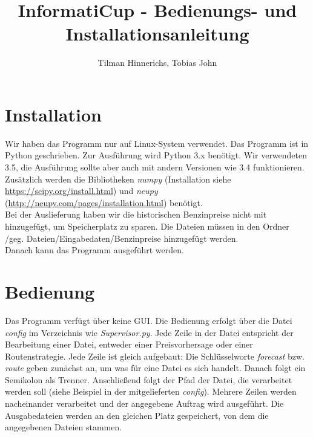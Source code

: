 \documentclass[11pt]{article}
\title{InformatiCup - Bedienungs- und Installationsanleitung}
\author{Tilman Hinnerichs, Tobias John}
\begin{document}
	
	\maketitle
	
	\section{Installation}
	Wir haben das Programm nur auf Linux-System verwendet. Das Programm ist in Python geschrieben. Zur Ausführung wird Python 3.x benötigt. Wir verwendeten 3.5, die Ausführung sollte aber auch mit andern Versionen wie 3.4 funktionieren. Zusätzlich werden die Bibliotheken \textit{numpy} (Installation siehe \url{https://scipy.org/install.html}) und \textit{neupy} (\url{http://neupy.com/pages/installation.html}) benötigt.\\
	Bei der Auslieferung haben wir die historischen Benzinpreise nicht mit hinzugefügt, um Speicherplatz zu sparen. Die Dateien müssen in den Ordner /geg. Dateien/Eingabedaten/Benzinpreise hinzugefügt werden.\\
	Danach kann das Programm ausgeführt werden.
	
	\section{Bedienung}
	Das Programm verfügt über keine GUI. Die Bedienung erfolgt über die Datei \textit{config} im Verzeichnis wie \textit{Supervisor.py}. Jede Zeile in der Datei entspricht der Bearbeitung einer Datei, entweder einer Preisvorhersage oder einer Routenstrategie. Jede Zeile ist gleich aufgebaut: Die Schlüsselworte \textit{forecast} bzw. \textit{route} geben zunächst an, um was für eine Datei es sich handelt. Danach folgt ein Semikolon als Trenner. Anschließend folgt der Pfad der Datei, die verarbeitet werden soll (siehe Beispiel in der mitgelieferten \textit{config}). Mehrere Zeilen werden nacheinander verarbeitet und der angegebene Auftrag wird ausgeführt. Die Ausgabedateien werden an den gleichen Platz gespeichert, von dem die angegebenen Dateien stammen.
	
	

	
\end{document}
